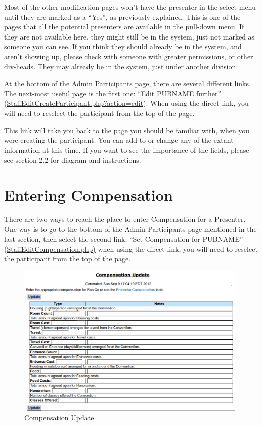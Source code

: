 \documentclass[tablesignature]{scrartcl}
\begin{document}
  Most of the other modification pages won't have the presenter in the
  select menu until they are marked as a ``Yes'', as previously
  explained.  This is one of the pages that all the potential
  presenters are available in the pull-down menu.  If they are not
  available here, they might still be in the system, just not marked
  as someone you can see.  If you think they should already be in the
  system, and aren't showing up, please check with someone with
  greater permissions, or other div-heads.  They may already be in the
  system, just under another division.

  At the bottom of the Admin Participants page, there are several
  different links.  The next-most useful page is the first one: ``Edit
  PUBNAME further'' (\hyperref[StaffEditCreateParticipant.php?action=edit]{StaffEditCreateParticipant.php?action=edit}). When
  using the direct link, you will need to reselect the participant
  from the top of the page.

  This link will take you back to the page you should be familiar
  with, when you were creating the participant.  You can add to or
  change any of the extant information at this time.  If you want to
  see the importance of the fields, please see section 2.2 for diagram
  and instructions.
\section{Entering Compensation}
\label{sec-4}


  There are two ways to reach the place to enter Compensation for a
  Presenter.  One way is to go to the bottom of the Admin Participants
  page mentioned in the last section, then select the second link:
  ``Set Compensation for PUBNAME'' (\hyperref[StaffEditCompensation.php)]{StaffEditCompensation.php)} when
  using the direct link, you will need to reselect the participant
  from the top of the page.

\begin{figure}[H]
\centering
\includegraphics[width=0.98\textwidth]{./Images/Compensation_Update.png}
\caption{\label{fig:Zambia_Presenter_Flow_Compensation_Update}Compensation Update}
\end{figure}
\end{document}
